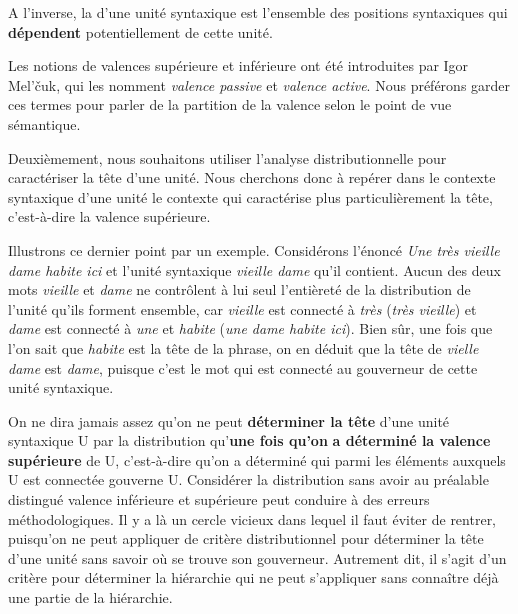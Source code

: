 \begin{styleLivreImportant}
A l’inverse, la  d’une unité syntaxique est l’ensemble des positions syntaxiques qui \textbf{dépendent} potentiellement de cette unité.
\end{styleLivreImportant}

Les notions de valences supérieure et inférieure ont été introduites par Igor Mel’čuk, qui les nomment \textit{valence passive} et \textit{valence active}. Nous préférons garder ces termes pour parler de la partition de la valence selon le point de vue sémantique.

Deuxièmement, nous souhaitons utiliser l’analyse distributionnelle pour caractériser la tête d’une unité. Nous cherchons donc à repérer dans le contexte syntaxique d’une unité le contexte qui caractérise plus particulièrement la tête, c’est-à-dire la valence supérieure.

Illustrons ce dernier point par un exemple. Considérons l’énoncé \textit{Une très vieille dame habite ici} et l’unité syntaxique \textit{vieille dame} qu’il contient. Aucun des deux mots \textit{vieille} et \textit{dame} ne contrôlent à lui seul l’entièreté de la distribution de l’unité qu’ils forment ensemble, car \textit{vieille} est connecté à \textit{très} (\textit{très vieille}) et \textit{dame} est connecté à \textit{une} et \textit{habite} (\textit{une dame habite ici}). Bien sûr, une fois que l’on sait que \textit{habite} est la tête de la phrase, on en déduit que la tête de \textit{vielle dame} est \textit{dame}, puisque c’est le mot qui est connecté au gouverneur de cette unité syntaxique.

On ne dira jamais assez qu’on ne peut \textbf{déterminer la tête} d’une unité syntaxique U par la distribution qu’\textbf{une fois qu’on} \textbf{a déterminé la valence supérieure} de U, c’est-à-dire qu’on a déterminé qui parmi les éléments auxquels U est connectée gouverne U. Considérer la distribution sans avoir au préalable distingué valence inférieure et supérieure peut conduire à des erreurs méthodologiques. Il y a là un cercle vicieux dans lequel il faut éviter de rentrer, puisqu’on ne peut appliquer de critère distributionnel pour déterminer la tête d’une unité sans savoir où se trouve son gouverneur. Autrement dit, il s’agit d’un critère pour déterminer la hiérarchie qui ne peut s’appliquer sans connaître déjà une partie de la hiérarchie.

